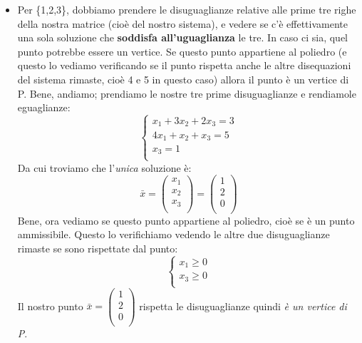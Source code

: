 \begin{enumerate}
\begin{itemize}
        \item Per \{1,2,3\}, dobbiamo prendere le disuguaglianze relative alle prime tre righe della nostra matrice (cioè del nostro sistema), e vedere se c'è effettivamente una sola soluzione che \textbf{soddisfa all'uguaglianza} le tre. In caso ci sia, quel punto potrebbe essere un vertice. Se questo punto appartiene al poliedro (e questo lo vediamo verificando se il punto rispetta anche le altre disequazioni del sistema rimaste, cioè 4 e 5 in questo caso) allora il punto è un vertice di P. Bene, andiamo; prendiamo le nostre tre prime disuguaglianze e rendiamole eguaglianze:
        \begin{equation*}
        \begin{cases}
            \text{$x_1 + 3x_2 + 2x_3 = 3$}\\
            \text{$4x_1 + x_2 + x_3 = 5$}\\
            \text{$x_3 = 1$}\\
        \end{cases}
        \end{equation*}
        Da cui troviamo che l'\textit{unica} soluzione è:
        \begin{equation*}
            \bar{x} = \begin{pmatrix}
                x_1\\
                x_2\\
                x_3\\
            \end{pmatrix} = \begin{pmatrix}
                1\\
                2\\
                0\\
            \end{pmatrix}
        \end{equation*}
        Bene, ora vediamo se questo punto appartiene al poliedro, cioè se è un punto ammissibile. Questo lo verifichiamo vedendo le altre due disuguaglianze rimaste se sono rispettate dal punto:
        \begin{equation*}
            \begin{cases}
            \text{$x_1 \geq 0$}\\
            \text{$x_3 \geq 0$}\\
            \end{cases}
        \end{equation*}
        Il nostro punto $\bar{x} = \begin{pmatrix}
                1\\
                2\\
                0\\
            \end{pmatrix}$ rispetta le disuguaglianze quindi \textit{è un vertice di P}.
            

\end{itemize}
\end{enumerate}
